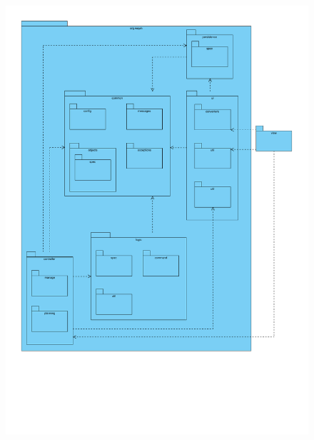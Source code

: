 \documentclass[fontsize=12pt,paper=a4,twoside]{scrartcl}
\begin{document}
\begin{figure}[H]
\centering
\includegraphics[width=\textwidth]{packages.pdf}
\end{figure}
\end{document}
